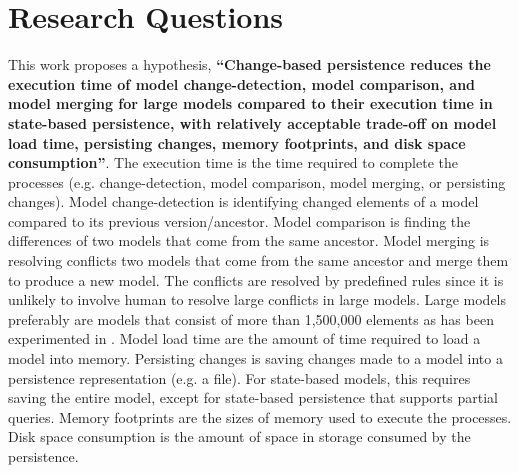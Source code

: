 \documentclass[12pt, a4paper]{report} \usepackage[titletoc]{appendix}
\begin{document}
\section{Research Questions}
\label{sec:research_questions}
This work proposes a hypothesis, \textbf{``Change-based persistence reduces the execution time of model change-detection, model comparison, and model merging for large models compared to their execution time in state-based persistence, with relatively acceptable trade-off on model load time, persisting changes, memory footprints, and disk space consumption''}. The execution time is the time required to complete the processes (e.g. change-detection, model comparison, model merging, or persisting changes). Model change-detection is identifying changed elements of a model compared to its previous version/ancestor. Model comparison is finding the differences of two models that come from the same ancestor. Model merging is resolving conflicts two models that come from the same ancestor and merge them to produce a new model. The conflicts are resolved by predefined rules since it is unlikely to involve human to resolve large conflicts in large models. Large models preferably are models that consist of more than 1,500,000 elements as has been experimented in \cite{daniel2016neoemf,pagan2011morsa}. Model load time are the amount of time required to load a model into memory. Persisting changes is saving changes made to a model into a persistence representation (e.g. a file). For state-based models, this requires saving the entire model, except for state-based persistence that supports partial queries. Memory footprints are the sizes of memory used to execute the processes. Disk space consumption is the amount of space in storage consumed by the persistence.  
\end{document}

